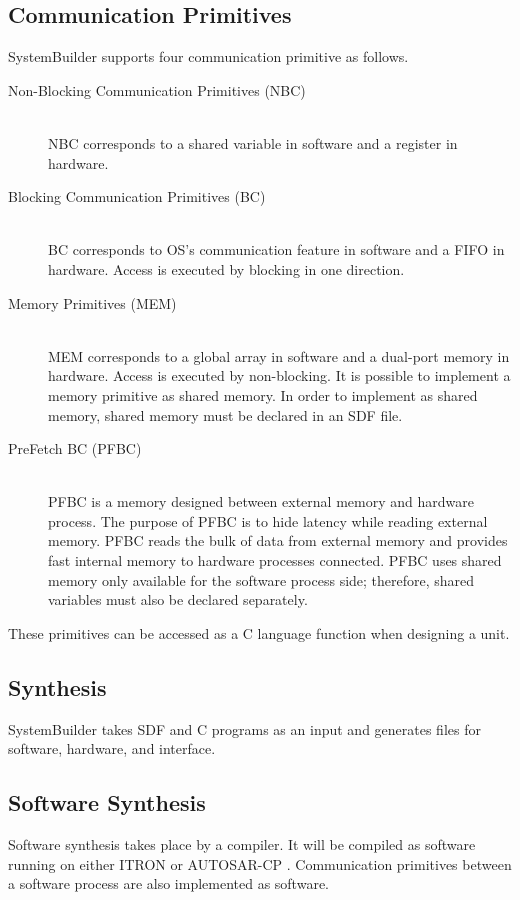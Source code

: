 \subsection{Communication Primitives}\label{sec:communication_primitives}
SystemBuilder supports four communication primitive as follows.

\begin{description}
  \item [Non-Blocking Communication Primitives (NBC)]\mbox{}\\
    NBC corresponds to a shared variable in software and a register in hardware.
  \item [Blocking Communication Primitives (BC)]\mbox{}\\
    BC corresponds to OS's communication feature in software and a FIFO in hardware. Access is executed by blocking in one direction.
  \item [Memory Primitives (MEM)]\mbox{}\\
    MEM corresponds to a global array in software and a dual-port memory in hardware. Access is executed by non-blocking.
    It is possible to implement a memory primitive as shared memory. In order to implement as shared memory, shared memory must be declared in an SDF file.
  \item [PreFetch BC (PFBC)]\mbox{}\\
    PFBC is a memory designed between external memory and hardware process. The purpose of PFBC is to hide latency while reading external memory. PFBC reads the bulk of data from external memory and provides fast internal memory to hardware processes connected. PFBC uses shared memory only available for the software process side; therefore, shared variables must also be declared separately.
\end{description}

These primitives can be accessed as a C language function when designing a unit.

\subsection{Synthesis} \label{sec:synthesis}
SystemBuilder takes SDF and C programs as an input and generates files for software, hardware, and interface.

\subsection {Software Synthesis}
Software synthesis takes place by a compiler. It will be compiled as software running on either ITRON \cite{sakamura1987itron} or AUTOSAR-CP \cite{autosar}. Communication primitives between a software process are also implemented as software.

